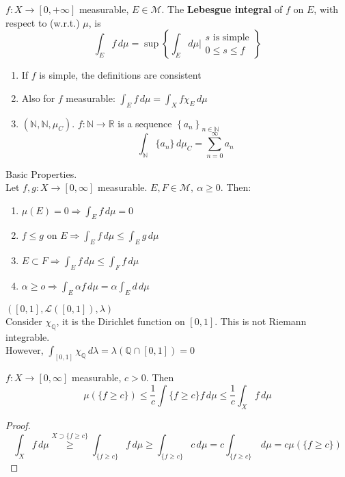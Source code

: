 \begin{definition}
    \(f:X \to [0, +\infty]\) measurable, \(E \in \mathcal{M}\). The \textbf{Lebesgue integral} of \(f\) on \(E\), with respect to (w.r.t.) \(\mu\), is 
    \[
        \int_E f \, d\mu = \sup \left\{ \int_E d\mu \vert \begin{array}{l}s\text{ is simple} \\ 0 \leq s \leq f \end{array}\right\}
    \]
\end{definition}

\begin{enumerate}
    \item If \(f \) is simple, the definitions are consistent
    \item Also for \(f\) measurable: \( \int_E f \, d\mu = \int_X f \chi_E \, d\mu\)
    \item \( \left( \mathbb{N}, \mathcal{\mathbb{N}}, \mu_C \right)\). \(f: \mathbb{N} \to \mathbb{R}\) is a sequence \( \left\{ a_n \right\}_{n \in \mathbb{N}}\) \[ \int_\mathbb{N} \{a_n\} \, d\mu_C = \sum_{n=0}^\infty a_n\]
\end{enumerate}

Basic Properties. \\
Let \(f, g : X \to \left[0, \infty\right]\) measurable. \(E, F \in \mathcal{M}, \ \alpha \geq 0\). Then: 
\begin{enumerate}
    \item \(\mu(E)=0 \Rightarrow \int_E f \, d\mu = 0\)
    \item \(f \leq g \) on \(E \Rightarrow \int_E f \, d\mu \leq \int_E g \, d\mu \)
    \item \(E \subset F \Rightarrow \int_E f \, d\mu \leq \int_F f \, d\mu\)
    \item \(\alpha \geq o \Rightarrow \int_E \alpha f \, d\mu = \alpha \int_E d \, d\mu\)
\end{enumerate}

\begin{remark}
    \(\left(\left[0, 1\right], \mathcal{L}(\left[0, 1\right]), \lambda  \right)\) \\
    Consider \(\chi_\mathbb{Q}\), it is the Dirichlet function on \(\left[0, 1\right]\). This is not Riemann integrable. \\ 
    However, \(\int_{\left[0,1\right]} \chi_{\mathbb{Q}} \, d\lambda = \lambda \left( \mathbb{Q} \cap \left[0,1\right] \right) =0 \)
\end{remark}

\begin{theorem}
    \(f: X \to \left[0, \infty \right]\) measurable, \(c > 0\). Then \[ \mu\left(\{f \geq c \}\right) \leq \frac{1}{c} \int{\{f \geq c \}} f \, d\mu \leq \frac{1}{c} \int_X f \, d\mu \]
\end{theorem}
\begin{proof}
    \[ \int_X f \, d\mu \overset{X \supset \{f \geq c\}}{\geq} \int_{\{f \geq c \}} f \, d\mu \geq \int_{\{f \geq c\}} c \, d\mu 
    = c \int_{\{f \geq c\}} \, d\mu 
    = c \mu \left(\{f \geq c\}\right) \]
\end{proof}

